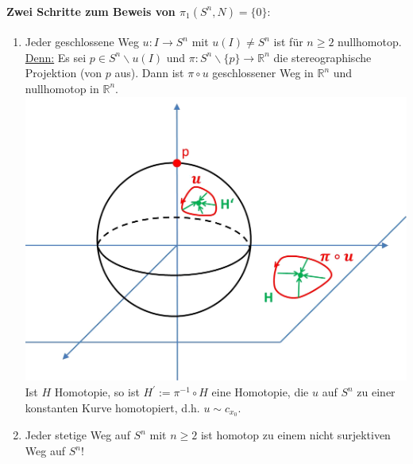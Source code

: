 \documentclass[a4paper,11pt,notitlepage]{report}
\theoremstyle{definition}
\newcommand{\R}{{\ensuremath{\mathbb{R}}}}
\begin{document}
\paragraph{Zwei Schritte zum Beweis von $\pi_1(S^n,N) = \{0\}:$}
\begin{enumerate}
	\item Jeder geschlossene Weg $u \colon I \rightarrow S^n$ mit $u(I) \neq S^n$ ist für $n \geq 2$ nullhomotop.
	\newline
	\underline{Denn:} Es sei $p \in S^n \backslash u(I)$ und $\pi \colon S^n \backslash \{p\} \rightarrow \R^n$ die stereographische Projektion (von $p$ aus). Dann ist $\pi \circ u$ geschlossener Weg in $\R^n$ und nullhomotop in $\R^n$. \newline \includegraphics[scale=0.4]{images/Weg_S2_nullhomotop.png}
	\newline
	Ist $H$ Homotopie, so ist $H^\prime := \pi^{-1} \circ H$ eine Homotopie, die $u$ auf $S^n$ zu einer konstanten Kurve homotopiert, d.h. $u \sim c_{x_0}$.
	
	\item Jeder stetige Weg auf $S^n$ mit $n\geq 2$ ist homotop zu einem nicht surjektiven Weg auf $S^n$!
\end{enumerate}
\end{document}
